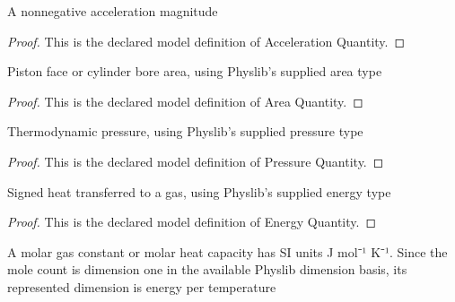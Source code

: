 \begin{definition}
  \label{def:physics:phyx-mini-0436:phyxminiproblems-problemphyxmini0436-accelerationquantity}
  A nonnegative acceleration magnitude
\end{definition}
\begin{proof}
  This is the declared model definition of Acceleration Quantity.
\end{proof}
\begin{definition}
  \label{def:physics:phyx-mini-0436:phyxminiproblems-problemphyxmini0436-areaquantity}
  Piston face or cylinder bore area, using Physlib's supplied area type
\end{definition}
\begin{proof}
  This is the declared model definition of Area Quantity.
\end{proof}
\begin{definition}
  \label{def:physics:phyx-mini-0436:phyxminiproblems-problemphyxmini0436-pressurequantity}
  Thermodynamic pressure, using Physlib's supplied pressure type
\end{definition}
\begin{proof}
  This is the declared model definition of Pressure Quantity.
\end{proof}
\begin{definition}
  \label{def:physics:phyx-mini-0436:phyxminiproblems-problemphyxmini0436-energyquantity}
  Signed heat transferred to a gas, using Physlib's supplied energy type
\end{definition}
\begin{proof}
  This is the declared model definition of Energy Quantity.
\end{proof}
\begin{definition}
  \label{def:physics:phyx-mini-0436:phyxminiproblems-problemphyxmini0436-molarenergypertemperaturequantity}
  A molar gas constant or molar heat capacity has SI units J mol⁻¹ K⁻¹. Since the mole count is dimension one in the available Physlib dimension basis, its represented dimension is energy per temperature
\end{definition}
